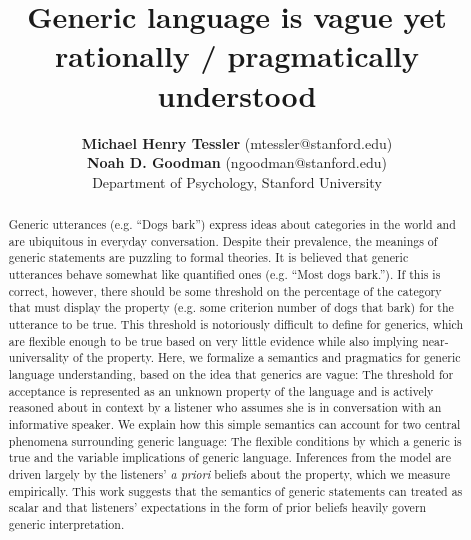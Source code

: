 \documentclass[10pt,letterpaper]{article}
\title{Generic language is vague yet rationally / pragmatically understood}
\author{{\large \bf Michael Henry Tessler} (mtessler@stanford.edu)\\ {\large \bf Noah D. Goodman} (ngoodman@stanford.edu) \\
  Department of Psychology, Stanford University}
\begin{document}
\maketitle


\begin{abstract}
Generic utterances (e.g. ``Dogs bark'') express ideas about categories in the world and are ubiquitous in everyday conversation. 
Despite their prevalence, the meanings of generic statements are puzzling to formal theories. 
It is believed that generic utterances behave somewhat like quantified ones (e.g. ``Most dogs bark.''). 
If this is correct, however, there should be some threshold on the percentage of the category that must display the property (e.g. some criterion number of dogs that bark) for the utterance to be true.
This threshold is notoriously difficult to define for generics, which are flexible enough to be true based on very little evidence while also implying near-universality of the property. 
Here, we formalize a semantics and pragmatics for generic language understanding, based on the idea that generics are vague: The threshold for acceptance is represented as an unknown property of the language and is actively reasoned about in context by a listener who assumes she is in conversation with an informative speaker. 
We explain how this simple semantics can account for two central phenomena surrounding generic language: The flexible conditions by which a generic is true and the variable implications of generic language. 
Inferences from the model are driven largely by the listeners' \emph{a priori} beliefs about the property, which we measure empirically.
This work suggests that the semantics of generic statements can treated as scalar and that listeners' expectations in the form of prior beliefs heavily govern generic interpretation. 



\end{abstract}
\end{document}
